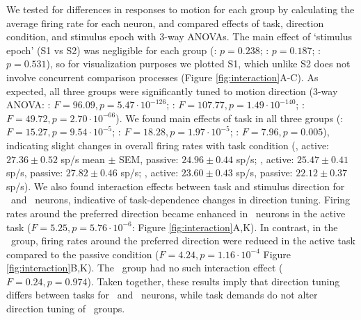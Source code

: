 We tested for differences in responses to motion for each group by calculating the average firing rate for each neuron, and compared effects of task, direction condition, and stimulus epoch with 3-way ANOVAs.
The main effect of `stimulus epoch' (S1 vs S2) was negligible for each group (\enhanced: $p=0.238$; \suppressed: $p=0.187$; \consistent: $p=0.531$), so for visualization purposes we plotted S1, which unlike S2 does not involve concurrent comparison processes (Figure \ref{fig:interaction}A-C). 
As expected, all three groups were significantly tuned to motion direction (3-way ANOVA: \enhanced: $F=96.09, p=5.47\cdot10^{-126}$; \suppressed: $F=107.77, p=1.49\cdot10^{-140}$; \consistent: $F=49.72, p=2.70\cdot10^{-66}$). 
We found main effects of task in all three groups (\enhanced: $F=15.27, p=9.54\cdot10^{-5}$; \suppressed: $F=18.28, p=1.97\cdot10^{-5}$; \consistent: $F=7.96, p=0.005$), indicating slight changes in overall firing rates with task condition (\enhanced, active: $27.36 \pm 0.52$ sp/s mean $\pm$ SEM, passive: $24.96 \pm 0.44$ sp/s; \suppressed, active: $25.47 \pm 0.41$ sp/s, passive: $27.82 \pm 0.46$ sp/s;
\consistent, active: $23.60 \pm 0.43$ sp/s, passive: $22.12 \pm 0.37$ sp/s).
We also found interaction effects between task and stimulus direction for \enhanced\ and \suppressed\ neurons, indicative of task-dependence changes in direction tuning.
Firing rates around the preferred direction became enhanced in \enhanced\ neurons in the active task ($F=5.25, p=5.76\cdot10^{-6}$: Figure \ref{fig:interaction}A,K).
In contrast, in the \suppressed\ group, firing rates around the preferred direction were reduced in the active task compared to the passive condition ($F=4.24, p=1.16\cdot10^{-4}$ Figure \ref{fig:interaction}B,K).
The \consistent\ group had no such interaction effect ($F=0.24, p=0.974$).
Taken together, these results imply that direction tuning differs between tasks for \enhanced\ and \suppressed\ neurons, while task demands do not alter direction tuning of \consistent\ groups.

